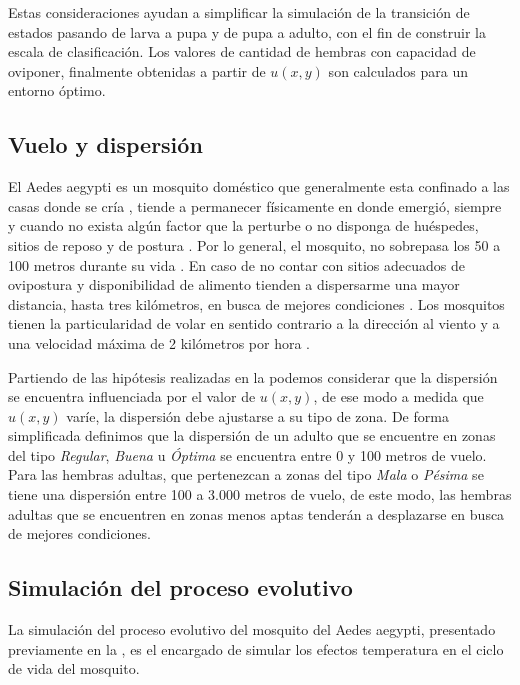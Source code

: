 Estas consideraciones ayudan a simplificar la simulación de la transición de estados pasando de
larva a pupa y de pupa a adulto, con el fin de construir la escala de clasificación. Los valores
de cantidad de hembras con capacidad de oviponer, finalmente obtenidas a partir de $u(x,y)$ son
calculados para un entorno óptimo.



\subsection{Vuelo y dispersión}
El Aedes aegypti es un mosquito doméstico que generalmente esta confinado a las casas donde se
cría \cite{luevano1993ciclo}, tiende a permanecer físicamente en donde emergió, siempre y cuando
no exista algún factor que la perturbe o no disponga de huéspedes, sitios de reposo y de postura
\cite{ThironIzcazaJ2003}. Por lo general, el mosquito, no sobrepasa los 50 a 100 metros durante su
vida \cite{cabezas2005dengue}. En caso de no contar con sitios adecuados de ovipostura y
disponibilidad de alimento tienden a dispersarme una mayor distancia, hasta tres kilómetros, en
busca de mejores condiciones \cite{ThironIzcazaJ2003}. Los mosquitos tienen la particularidad de
volar en sentido contrario a la dirección al viento \cite{ThironIzcazaJ2003,web-site:speedAnimals}
y a una velocidad máxima de 2 kilómetros por hora \cite{web-site:speedAnimals,kaufmann2004flight}.

Partiendo de las hipótesis realizadas en la podemos considerar
que la dispersión se encuentra influenciada por el valor de $u(x,y)$, de ese modo a medida que
$u(x,y)$ varíe, la dispersión debe ajustarse a su tipo de zona. De forma simplificada definimos que
la dispersión de un adulto que se encuentre en zonas del tipo \textit{Regular}, \textit{Buena} u
\textit{Óptima} se encuentra entre 0 y 100 metros de vuelo. Para las hembras adultas, que
pertenezcan a zonas del tipo \textit{Mala} o \textit{Pésima} se tiene una dispersión entre 100 a
3.000 metros de vuelo, de este modo, las hembras adultas que se encuentren en zonas menos aptas
tenderán a desplazarse en busca de mejores condiciones.


\subsection{Simulación del proceso evolutivo}
La simulación del proceso evolutivo del mosquito del Aedes aegypti, presentado previamente en la
, es el encargado de simular los efectos temperatura
en el ciclo de vida del mosquito.

